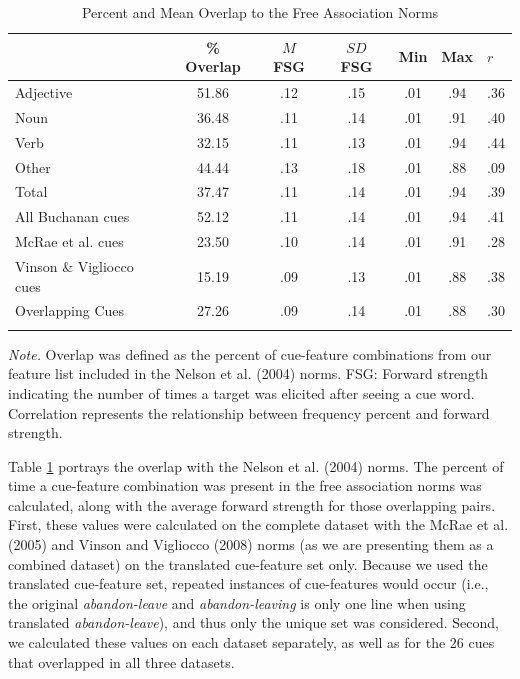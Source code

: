 \documentclass[english,,man]{apa6}
\begin{document}
\begin{table}[tbp]
\begin{center}
\begin{threeparttable}
\caption{\label{tab:divergent-table}Percent and Mean Overlap to the Free Association Norms}
\begin{tabular}{lcccccl}
\toprule
  & \% Overlap & $M$ FSG & $SD$ FSG & Min & Max & $r$\\
\midrule
Adjective & 51.86 & .12 & .15 & .01 & .94 & .36\\
Noun & 36.48 & .11 & .14 & .01 & .91 & .40\\
Verb & 32.15 & .11 & .13 & .01 & .94 & .44\\
Other & 44.44 & .13 & .18 & .01 & .88 & .09\\
Total & 37.47 & .11 & .14 & .01 & .94 & .39\\
All Buchanan cues & 52.12 & .11 & .14 & .01 & .94 & .41\\
McRae et al. cues & 23.50 & .10 & .14 & .01 & .91 & .28\\
Vinson \& Vigliocco cues & 15.19 & .09 & .13 & .01 & .88 & .38\\
Overlapping Cues & 27.26 & .09 & .14 & .01 & .88 & .30\\
\bottomrule
\addlinespace
\end{tabular}
\begin{tablenotes}[para]
\normalsize{\textit{Note.} Overlap was defined as the percent of cue-feature combinations from our feature list included in the Nelson et al. (2004) norms. FSG: Forward strength indicating the number of times a target was elicited after seeing a cue word. Correlation represents the relationship between frequency percent and forward strength.}
\end{tablenotes}
\end{threeparttable}
\end{center}
\end{table}

Table \ref{tab:divergent-table} portrays the overlap with the Nelson et al. (2004) norms. The percent of time a cue-feature combination was present in the free association norms was calculated, along with the average forward strength for those overlapping pairs. First, these values were calculated on the complete dataset with the McRae et al. (2005) and Vinson and Vigliocco (2008) norms (as we are presenting them as a combined dataset) on the translated cue-feature set only. Because we used the translated cue-feature set, repeated instances of cue-features would occur (i.e., the original \emph{abandon-leave} and \emph{abandon-leaving} is only one line when using translated \emph{abandon-leave}), and thus only the unique set was considered. Second, we calculated these values on each dataset separately, as well as for the 26 cues that overlapped in all three datasets.
\end{document}
